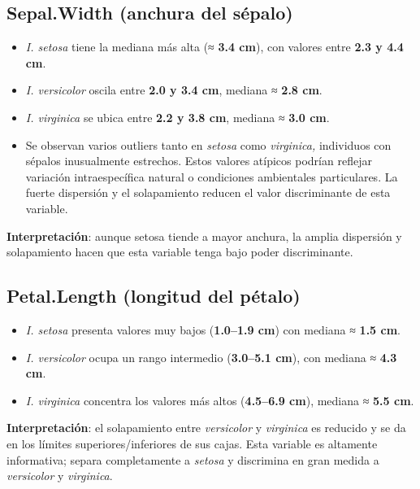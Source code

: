 \documentclass[
  spanish,
  11pt,
  a4paper,
  DIV=11,
  numbers=noendperiod]{scrartcl}
\providecommand{\tightlist}{%
  \setlength{\itemsep}{0pt}\setlength{\parskip}{0pt}}
\begin{document}
\subsection{Sepal.Width (anchura del
sépalo)}\label{sepal.width-anchura-del-suxe9palo}

\begin{itemize}
\item
  \emph{I. setosa} tiene la mediana más alta (≈ \textbf{3.4 cm}), con
  valores entre \textbf{2.3 y 4.4 cm}.\\
\item
  \emph{I. versicolor} oscila entre \textbf{2.0 y 3.4 cm}, mediana ≈
  \textbf{2.8 cm}.\\
\item
  \emph{I. virginica} se ubica entre \textbf{2.2 y 3.8 cm}, mediana ≈
  \textbf{3.0 cm}.
\item
  Se observan varios outliers tanto en \emph{setosa} como
  \emph{virginica,} individuos con sépalos inusualmente estrechos. Estos
  valores atípicos podrían reflejar variación intraespecífica natural o
  condiciones ambientales particulares. La fuerte dispersión y el
  solapamiento reducen el valor discriminante de esta variable.
\end{itemize}

\textbf{Interpretación}: aunque setosa tiende a mayor anchura, la amplia
dispersión y solapamiento hacen que esta variable tenga bajo poder
discriminante.

\subsection{Petal.Length (longitud del
pétalo)}\label{petal.length-longitud-del-puxe9talo}

\begin{itemize}
\tightlist
\item
  \emph{I. setosa} presenta valores muy bajos (\textbf{1.0--1.9 cm}) con
  mediana ≈ \textbf{1.5 cm}.\\
\item
  \emph{I. versicolor} ocupa un rango intermedio (\textbf{3.0--5.1 cm}),
  con mediana ≈ \textbf{4.3 cm}.\\
\item
  \emph{I. virginica} concentra los valores más altos (\textbf{4.5--6.9
  cm}), mediana ≈ \textbf{5.5 cm}.
\end{itemize}

\textbf{Interpretación}: el solapamiento entre \emph{versicolor} y
\emph{virginica} es reducido y se da en los límites
superiores/inferiores de sus cajas. Esta variable es altamente
informativa; separa completamente a \emph{setosa} y discrimina en gran
medida a \emph{versicolor} y \emph{virginica}.
\end{document}
